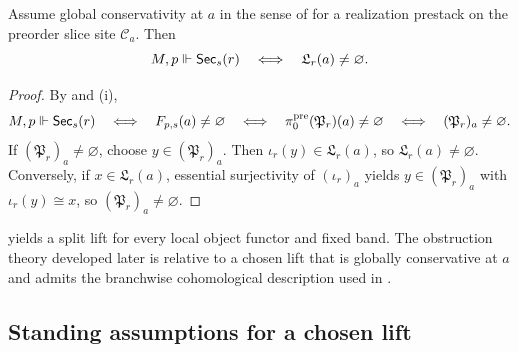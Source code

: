 \begin{proposition}\label{prop:no-new-global-objects}
Assume global conservativity at $a$ in the sense of  for a realization prestack on the preorder slice site $\mathcal C_a$. Then
\[
M,p\Vdash \mathsf{Sec}_s(r)
\quad\Longleftrightarrow\quad
\mathfrak L_r(a)\neq\varnothing.
\]
\end{proposition}

\begin{proof}
By  and (i),
\[
M,p\Vdash \mathsf{Sec}_s(r)
\quad\Longleftrightarrow\quad
F_{p,s}(a)\neq\varnothing
\quad\Longleftrightarrow\quad
\pi_0^{\mathrm{pre}}(\mathfrak P_r)(a)\neq\varnothing
\quad\Longleftrightarrow\quad
(\mathfrak P_r)_a\neq\varnothing.
\]
If $(\mathfrak P_r)_a\neq\varnothing$, choose $y\in (\mathfrak P_r)_a$. Then $\iota_r(y)\in \mathfrak L_r(a)$, so $\mathfrak L_r(a)\neq\varnothing$. Conversely, if $x\in \mathfrak L_r(a)$, essential surjectivity of $(\iota_r)_a$ yields $y\in (\mathfrak P_r)_a$ with $\iota_r(y)\cong x$, so $(\mathfrak P_r)_a\neq\varnothing$.
\end{proof}

\begin{remark}\label{rem:gluing-sensitive-lifts}
 yields a split lift for every local object functor and fixed band. The obstruction theory developed later is relative to a chosen lift that is globally conservative at $a$ and admits the branchwise cohomological description used in .
\end{remark}

\subsection{Standing assumptions for a chosen lift}\label{subsec:scope-chosen-lift}

